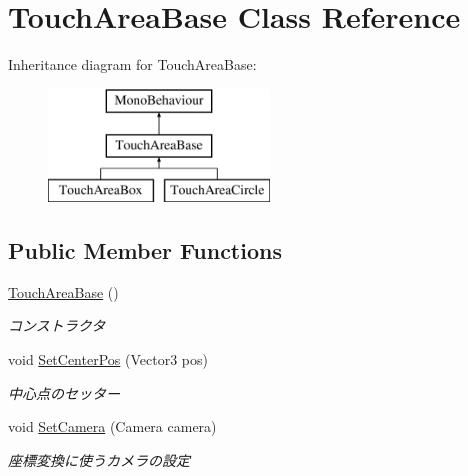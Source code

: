 \hypertarget{class_touch_area_base}{}\section{Touch\+Area\+Base Class Reference}
\label{class_touch_area_base}
Inheritance diagram for Touch\+Area\+Base\+:\begin{figure}[H]
\begin{center}
\leavevmode
\includegraphics[height=3.000000cm]{class_touch_area_base}
\end{center}
\end{figure}
\subsection*{Public Member Functions}
\begin{DoxyCompactItemize}
\item 
\hyperlink{class_touch_area_base_a3d23db92ff531c2766cbd8547620b57d}{Touch\+Area\+Base} ()
\begin{DoxyCompactList}\small\item\em コンストラクタ \end{DoxyCompactList}\item 
void \hyperlink{class_touch_area_base_ad22019b970c42ebd4d6c9d44b5efcdcb}{Set\+Center\+Pos} (Vector3 pos)
\begin{DoxyCompactList}\small\item\em 中心点のセッター \end{DoxyCompactList}\item 
void \hyperlink{class_touch_area_base_aa63f2d3e25e2343fee2f2993a34e22ea}{Set\+Camera} (Camera camera)
\begin{DoxyCompactList}\small\item\em 座標変換に使うカメラの設定 \end{DoxyCompactList}\end{DoxyCompactItemize}

